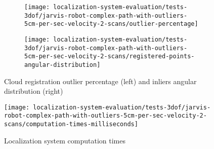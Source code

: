 \begin{figure}[ht]
	\centering
	\begin{subfigure}[h]{.497\textwidth}
		\centering
		\texttt{[image: localization-system-evaluation/tests-3dof/jarvis-robot-complex-path-with-outliers-5cm-per-sec-velocity-2-scans/outlier-percentage]}
	\end{subfigure}
	\begin{subfigure}[h]{.497\textwidth}
		\centering
		\texttt{[image: localization-system-evaluation/tests-3dof/jarvis-robot-complex-path-with-outliers-5cm-per-sec-velocity-2-scans/registered-points-angular-distribution]}
	\end{subfigure}
	\caption{Cloud registration outlier percentage (left) and inliers angular distribution (right)}
	\label{fig:localization-system-evaluation_jarvis-robot-complex-path-with-outliers-5cm-per-sec-velocity-2-scans_analysis}
\end{figure}

\begin{figure}[ht]
	\centering
	\texttt{[image: localization-system-evaluation/tests-3dof/jarvis-robot-complex-path-with-outliers-5cm-per-sec-velocity-2-scans/computation-times-milliseconds]}
	\caption{Localization system computation times}
	\label{fig:localization-system-evaluation_jarvis-robot-complex-path-with-outliers-5cm-per-sec-velocity-2-scans_computation-time}
\end{figure}
